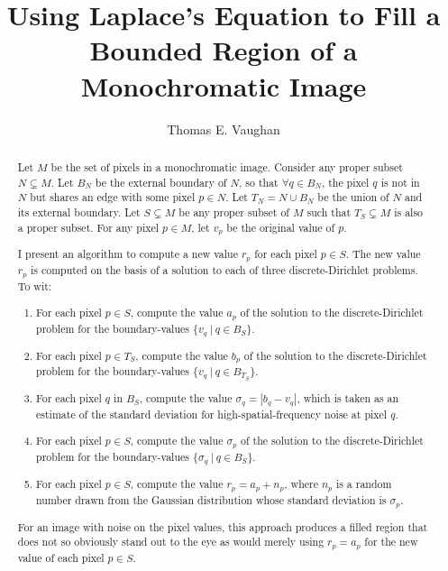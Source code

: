 \documentclass{article}
\title{%
Using Laplace's Equation to Fill a Bounded Region of a Monochromatic Image%
}
\author{Thomas E. Vaughan}
\newcommand{\foreach}{\forall}
\begin{document}
\maketitle

\begin{abstract}

   Let $M$ be the set of pixels in a monochromatic image.  Consider any proper
   subset $N \subsetneq M$.  Let $B_N$ be the external boundary of $N$, so that
   $\foreach q \in B_N$, the pixel $q$ is not in $N$ but shares an edge with
   some pixel $p \in N$.  Let $T_N = N \cup B_N$ be the union of $N$ and its
   external boundary.  Let $S \subsetneq M$ be any proper subset of $M$ such
   that $T_S \subsetneq M$ is also a proper subset.  For any pixel $p \in M$,
   let $v_p$ be the original value of $p$.

   I present an algorithm to compute a new value $r_p$ for each pixel $p \in
   S$.  The new value $r_p$ is computed on the basis of a solution to each of
   three discrete-Dirichlet problems.  To wit:
   \begin{enumerate}
      \item For each pixel $p \in S$, compute the value $a_p$ of the solution
         to the discrete-Dirichlet problem for the boundary-values $\{v_q \: |
         \: q \in B_S\}$.
      \item For each pixel $p \in T_S$, compute the value $b_p$ of the solution
         to the discrete-Dirichlet problem for the boundary-values $\{v_q \: |
         \: q \in B_{T_S}\}$.
      \item For each pixel $q$ in $B_S$, compute the value $\sigma_q = |b_q -
         v_q|$, which is taken as an estimate of the standard deviation for
         high-spatial-frequency noise at pixel $q$.
      \item For each pixel $p \in S$, compute the value $\sigma_p$ of the
         solution to the discrete-Dirichlet problem for the boundary-values
         $\{\sigma_q \: | \: q \in B_S\}$.
      \item For each pixel $p \in S$, compute the value $r_p = a_p + n_p$,
         where $n_p$ is a random number drawn from the Gaussian distribution
         whose standard deviation is $\sigma_p$.
   \end{enumerate}
   For an image with noise on the pixel values, this approach produces a filled
   region that does not so obviously stand out to the eye as would merely using
   $r_p = a_p$ for the new value of each pixel $p \in S$.

\end{abstract}
\end{document}
